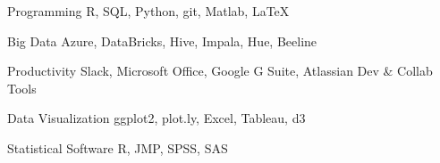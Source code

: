 

\begin{cvskills}

  \cvskill
    {Programming} %
    {R, SQL, Python, git, Matlab, \LaTeX} %

  \cvskill
    {Big Data} %
    {Azure, DataBricks, Hive, Impala, Hue, Beeline} %

  \cvskill
    {Productivity} %
    {Slack, Microsoft Office, Google G Suite, Atlassian Dev \& Collab Tools} %

  \cvskill
    {Data Visualization} %
    {ggplot2, plot.ly, Excel, Tableau, d3} %

  \cvskill
    {Statistical Software} %
    {R, JMP, SPSS, SAS} %

\end{cvskills}
